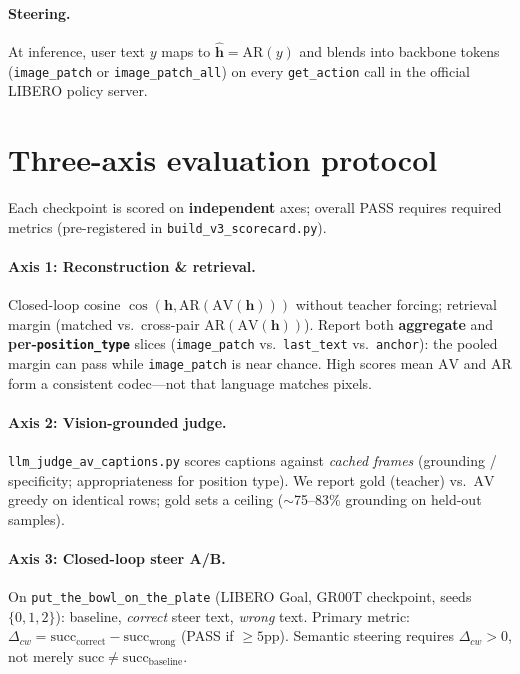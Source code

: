 \documentclass[10pt]{article}
\newcommand{\AV}{\ensuremath{\mathrm{AV}}}
\newcommand{\AR}{\ensuremath{\mathrm{AR}}}
\newcommand{\hvec}{\mathbf{h}}
\newcommand{\hhat}{\hat{\mathbf{h}}}
\newcommand{\code}[1]{\texttt{\small #1}}
\begin{document}
\paragraph{Steering.}
At inference, user text \(y\) maps to \(\hhat=\AR(y)\) and blends into
backbone tokens (\code{image\_patch} or \code{image\_patch\_all}) on every
\code{get\_action} call in the official LIBERO policy server.

\section{Three-axis evaluation protocol}
\label{sec:protocol}

Each checkpoint is scored on \textbf{independent} axes; overall PASS requires
required metrics (pre-registered in \code{build\_v3\_scorecard.py}).

\paragraph{Axis 1: Reconstruction \& retrieval.}
Closed-loop cosine \(\cos(\hvec,\AR(\AV(\hvec)))\) without teacher forcing;
retrieval margin (matched vs.\ cross-pair \(\AR(\AV(\hvec))\)).
Report both \textbf{aggregate} and \textbf{per-\code{position\_type}} slices
(\code{image\_patch} vs.\ \code{last\_text} vs.\ \code{anchor}): the pooled
margin can pass while \code{image\_patch} is near chance.
High scores mean \(\AV\) and \(\AR\) form a consistent codec---not that
language matches pixels.

\paragraph{Axis 2: Vision-grounded judge.}
\code{llm\_judge\_av\_captions.py} scores captions against \emph{cached frames}
(grounding / specificity; appropriateness for position type).
We report gold (teacher) vs.\ \(\AV\) greedy on identical rows; gold sets a
ceiling ($\sim$75--83\% grounding on held-out samples).

\paragraph{Axis 3: Closed-loop steer A/B.}
On \code{put\_the\_bowl\_on\_the\_plate} (LIBERO Goal, GR00T checkpoint,
seeds \(\{0,1,2\}\)): baseline, \emph{correct} steer text, \emph{wrong} text.
Primary metric: \(\Delta_{cw} = \mathrm{succ}_{\text{correct}} -
\mathrm{succ}_{\text{wrong}}\) (PASS if $\geq 5$pp).
Semantic steering requires \(\Delta_{cw} > 0\), not merely
\(\mathrm{succ} \neq \mathrm{succ}_{\text{baseline}}\).
\end{document}
